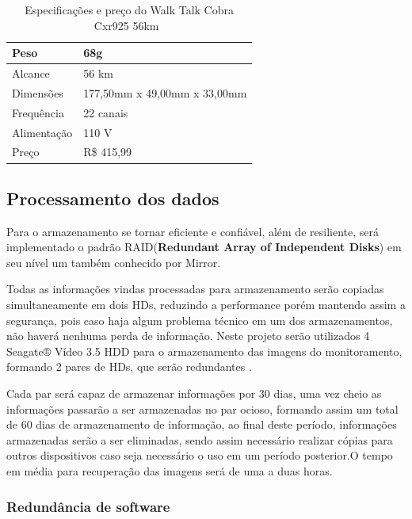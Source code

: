 \begin{table}[H]
\centering
\begin{tabular}{|l|l|}
\hline
Peso        & 68g                          \\ \hline
Alcance     & 56 km                        \\ \hline
Dimensões   & 177,50mm x 49,00mm x 33,00mm \\ \hline
Frequência  & 22 canais                    \\ \hline
Alimentação & 110 V                        \\ \hline
Preço       & R\$ 415,99                   \\ \hline
\end{tabular}
\caption[Especificações e preço do Walk Talk Cobra Cxr925 56km]{Especificações e preço do Walk Talk Cobra Cxr925 56km~\cite{walk}}
\label{table:walk}
\end{table}

\subsection{Processamento dos dados}

Para o armazenamento se tornar eficiente e confiável, além de resiliente, será implementado o
padrão RAID(\textbf{Redundant Array of Independent Disks}) em seu nível um também conhecido por
Mirror.

Todas as informações vindas processadas para armazenamento serão copiadas
simultaneamente em dois HDs, reduzindo a performance porém mantendo assim a segurança,
pois caso haja algum problema técnico em um dos armazenamentos, não haverá nenhuma
perda de informação. Neste projeto serão utilizados 4 Seagate® Vídeo 3.5 HDD para o
armazenamento das imagens do monitoramento, formando 2 pares de HDs, que serão
redundantes \cite{raid}.

Cada par será capaz de armazenar informações por 30 dias, uma vez cheio as informações passarão a ser armazenadas no par ocioso, formando assim um total de 60 dias de armazenamento de informação, ao final deste período, informações armazenadas serão a ser eliminadas, sendo assim necessário realizar cópias para outros dispositivos caso seja necessário o uso em um período posterior.O tempo em média para recuperação das imagens será de uma a duas horas.

\subsubsection{Redundância de software}

